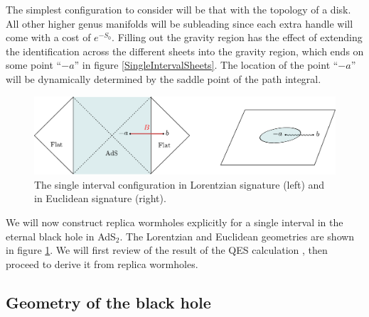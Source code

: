 The simplest configuration to consider will be that with the topology of a disk. All other higher genus manifolds will be subleading since each extra handle will come with a cost of $e^{-S_0}$. Filling out the gravity region has the effect of extending the identification across the different sheets into the gravity region, which ends on some point ``$-a$'' in figure \ref{SingleIntervalSheets}. The location of the point ``$-a$'' will be dynamically determined by the saddle point of the path integral.


\begin{figure}
\begin{center}
\includegraphics[scale=0.7]{figures/single-interval.pdf}
\end{center}
\caption{\small The single interval configuration in Lorentzian signature (left) and in Euclidean signature (right).  
\label{SingleLandE}}
\end{figure}

We will now construct replica wormholes explicitly for a single interval in the eternal black hole in AdS$_2$.  The Lorentzian and Euclidean geometries are shown in figure \ref{SingleLandE}. 
 We will first review of the result of the QES calculation \cite{Almheiri:2019yqk}, then proceed to derive it from replica wormholes.


\subsection{Geometry of the black hole}


